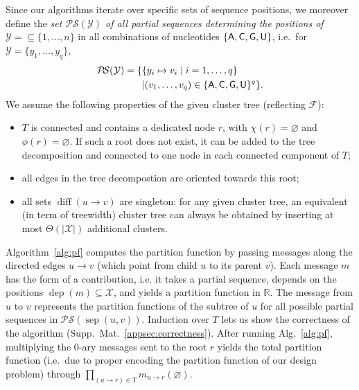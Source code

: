 \documentclass[]{bmcart}
\newcommand{\dep}{\operatorname{dep}}
\newcommand{\separator}[2]{\operatorname{sep}(#1,#2)}
\newcommand{\difference}[2]{\operatorname{diff}(#1 \rightarrow #2)}
\newcommand{\real}{\mathbb{R}}
\newcommand{\Message}[2]{m_{#1\rightarrow #2}}
\newcommand{\partseqs}{\mathcal{P\!S}}
\newcommand{\F}{\mathcal{F}}
\newcommand{\X}{\mathcal{X}}
\newcommand{\Y}{\mathcal{Y}}
\newcommand{\Def}[1]{\emph{#1}}
\newcommand{\Nuc}[1]{{\sf #1}}
\newcommand{\Ab}{\Nuc{A}}
\newcommand{\Cb}{\Nuc{C}}
\newcommand{\Gb}{\Nuc{G}}
\newcommand{\Ub}{\Nuc{U}}
\newcommand{\evalfor}[2]{#1(#2)}
\begin{document}
Since our algorithms iterate over specific sets of sequence positions, we moreover define
the \Def{set $\partseqs(\Y)$ of all partial sequences determining the positions of $\Y=\subseteq\{1,\dots,n\}$} in all combinations of nucleotides $\{\Ab,\Cb,\Gb,\Ub\}$,
i.e.~for $\Y=\{y_1,\dots,y_{q}\}$,
\begin{align*}
\partseqs(\Y) = \{ & \{ y_i\mapsto v_i \mid i=1,\dots,q \} \\& | (v_1,\dots,v_{q}) \in \{\Ab,\Cb,\Gb,\Ub\}^{q} \}.
\end{align*}
%
We assume the following properties of the given cluster tree (reflecting $\F$):
\begin{itemize}
\item
$T$ is
connected and contains a dedicated node $r$, with
$\chi(r)=\varnothing$ and $\phi(r)=\varnothing$. If such a root does not exist, it can be added to the tree decomposition and connected to one node in each connected component of $T$;
\item
all edges in the tree decompostion are oriented towards this root;
\item
all sets $\difference{u}{v}$ are singleton: for any given
cluster tree, an equivalent (in term of treewidth) cluster tree can
always be obtained by inserting at most $\Theta(|\X|)$ additional
clusters.
\end{itemize}

Algorithm~\ref{alg:pf} computes the partition function by passing
messages along the directed edges $u\to v$ (which point from 
child $u$ to its parent $v$). Each message $m$ has the form of a contribution, i.e. it takes a partial sequence, depends
on the positions $\dep(m)\subseteq \X$, and yields a partition function
in $\real$. The message from $u$ to $v$ represents the
partition functions of the subtree of $u$ for all possible partial
sequences in $\partseqs(\separator{u}{v})$. Induction over $T$ lets us show
the correctness of the algorithm
(Supp.\ Mat.~\ref{appsec:correctness}).  After running
Alg.~\ref{alg:pf}, multiplying the 0-ary messages sent to the root $r$
yields the total partition function (i.e.~due to proper encoding the partition function of our design problem) through
\begin{math}
  \prod_{(u\to{}r)\in T} \evalfor{\Message{u}{r}}{\varnothing}.
\end{math}
\end{document}
